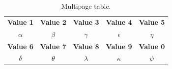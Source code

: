 \documentclass[11pt]{article}  %
\begin{document}
      \begin{longtable}[c]{c|S|c|c|c}  %
        \caption{Multipage table.}
        \label{t7}\\
        \toprule
        \textbf{Value 1} & \textbf{Value 2} & \textbf{Value 3} & \textbf{Value 4} & \textbf{Value 5} \\
        $\alpha$         & $\beta$          & $\gamma$         & $\epsilon$       & $\eta$           \\
        \midrule
        \endfirsthead    %

        \toprule
        \textbf{Value 6} & \textbf{Value 7} & \textbf{Value 8} & \textbf{Value 9} & \textbf{Value 0} \\
        $\delta$         & $\theta$         & $\lambda$        & $\kappa$         & $\psi$           \\
        \midrule


\end{longtable}
\end{document}
